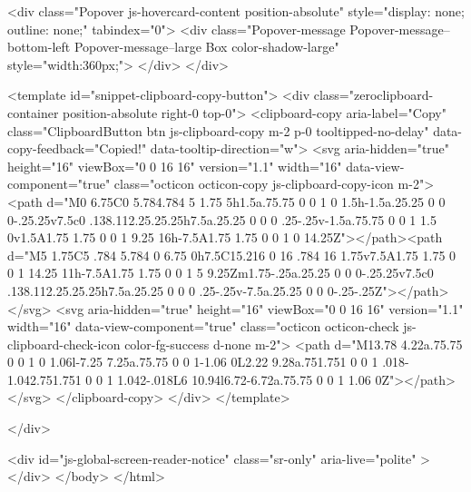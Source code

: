     <div class="Popover js-hovercard-content position-absolute" style="display: none; outline: none;" tabindex="0">
  <div class="Popover-message Popover-message--bottom-left Popover-message--large Box color-shadow-large" style="width:360px;">
  </div>
</div>

    <template id="snippet-clipboard-copy-button">
  <div class="zeroclipboard-container position-absolute right-0 top-0">
    <clipboard-copy aria-label="Copy" class="ClipboardButton btn js-clipboard-copy m-2 p-0 tooltipped-no-delay" data-copy-feedback="Copied!" data-tooltip-direction="w">
      <svg aria-hidden="true" height="16" viewBox="0 0 16 16" version="1.1" width="16" data-view-component="true" class="octicon octicon-copy js-clipboard-copy-icon m-2">
    <path d="M0 6.75C0 5.784.784 5 1.75 5h1.5a.75.75 0 0 1 0 1.5h-1.5a.25.25 0 0 0-.25.25v7.5c0 .138.112.25.25.25h7.5a.25.25 0 0 0 .25-.25v-1.5a.75.75 0 0 1 1.5 0v1.5A1.75 1.75 0 0 1 9.25 16h-7.5A1.75 1.75 0 0 1 0 14.25Z"></path><path d="M5 1.75C5 .784 5.784 0 6.75 0h7.5C15.216 0 16 .784 16 1.75v7.5A1.75 1.75 0 0 1 14.25 11h-7.5A1.75 1.75 0 0 1 5 9.25Zm1.75-.25a.25.25 0 0 0-.25.25v7.5c0 .138.112.25.25.25h7.5a.25.25 0 0 0 .25-.25v-7.5a.25.25 0 0 0-.25-.25Z"></path>
</svg>
      <svg aria-hidden="true" height="16" viewBox="0 0 16 16" version="1.1" width="16" data-view-component="true" class="octicon octicon-check js-clipboard-check-icon color-fg-success d-none m-2">
    <path d="M13.78 4.22a.75.75 0 0 1 0 1.06l-7.25 7.25a.75.75 0 0 1-1.06 0L2.22 9.28a.751.751 0 0 1 .018-1.042.751.751 0 0 1 1.042-.018L6 10.94l6.72-6.72a.75.75 0 0 1 1.06 0Z"></path>
</svg>
    </clipboard-copy>
  </div>
</template>




    </div>

    <div id="js-global-screen-reader-notice" class="sr-only" aria-live="polite" ></div>
  </body>
</html>

